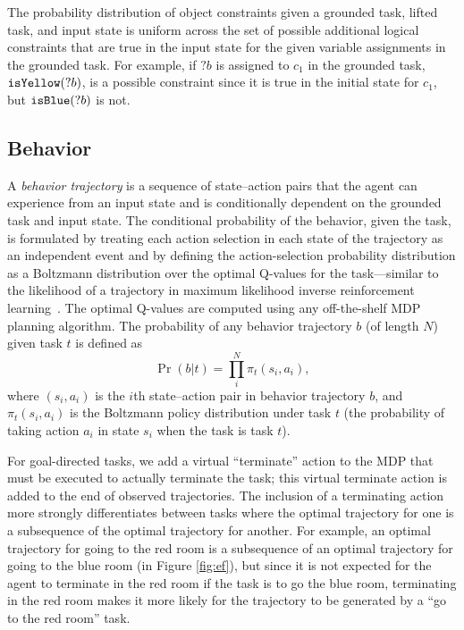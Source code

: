 \documentclass[conference]{IEEEtran}
\begin{document}
The probability distribution of object constraints given a grounded task, lifted task, and input state is uniform across the set of possible additional logical constraints that are true in the input state for the given variable assignments in the grounded task. For example, if $?b$ is assigned to $c_1$ in the grounded task, ${\tt isYellow}(?b)$, is a possible constraint since it is true in the initial state for $c_1$, but ${\tt isBlue}(?b)$ is not.

\subsection{Behavior}
A \emph{behavior trajectory} is a sequence of state--action pairs that the agent can experience from an input state and is conditionally dependent on the grounded task and input state. The conditional probability of the behavior, given the task, is formulated by treating each action selection in each state of the trajectory as an independent event and by defining the action-selection probability distribution as a Boltzmann distribution over the optimal Q-values for the task---similar to the likelihood of a trajectory in maximum likelihood inverse reinforcement learning~\cite{babes11}. The optimal Q-values are computed using any off-the-shelf MDP planning algorithm. The probability of any behavior trajectory $b$ (of length $N$) given task $t$ is defined as 
\begin{equation}
\label{eq:trajProb}
\Pr(b | t) = \prod^N_i \pi_t(s_i, a_i), 
\end{equation}
where $(s_i, a_i)$ is the $i$th state--action pair in behavior trajectory $b$, and $\pi_t(s_i, a_i)$ is the Boltzmann policy distribution under task $t$ (the probability of taking action $a_i$ in state $s_i$ when the task is task $t$). 


For goal-directed tasks, we add a virtual ``terminate'' action to the MDP that must be executed to actually terminate the task; this virtual terminate action is added to the end of observed trajectories. The inclusion of a terminating action more strongly differentiates between tasks where the optimal trajectory for one is a subsequence of the optimal trajectory for another. For example, an optimal trajectory for going to the red room is a subsequence of an optimal trajectory for going to the blue room (in Figure \ref{fig:ef}), but since it is not expected for the agent to terminate in the red room if the task is to go the blue room, terminating in the red room makes it more likely for the trajectory to be generated by a ``go to the red room'' task.
\end{document}
